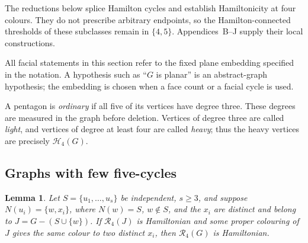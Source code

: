 \documentclass[11pt]{article}
\newtheorem{lemma}[theorem]{Lemma}
\theoremstyle{remark}
\newcommand{\R}{\mathcal R}
\numberwithin{equation}{section}
\numberwithin{table}{section}
\begin{document}
The reductions below splice Hamilton cycles and establish
Hamiltonicity at four colours. They do not prescribe arbitrary
endpoints, so the Hamilton-connected thresholds of these subclasses
remain in $\{4,5\}$. Appendices~B--J supply their local
constructions.

All facial statements in this section refer to the fixed plane embedding
specified in the notation.  A hypothesis such as ``$G$ is planar'' is an
abstract-graph hypothesis; the embedding is chosen when a face count or a
facial cycle is used.

A pentagon is \emph{ordinary} if all five of its vertices have degree three.
These degrees are measured in the graph before deletion. Vertices of degree
three are called \emph{light}, and vertices of degree at least four are
called \emph{heavy}; thus the heavy vertices are precisely
$\mathcal H_4(G)$.

\subsection{Graphs with few five-cycles}
\begin{lemma}
\label{lem:subdivided-star-four-subclass}
Let $S=\{u_1,\ldots,u_s\}$ be independent, $s\ge3$, and suppose
$N(u_i)=\{w,x_i\}$, where $N(w)=S$, $w\notin S$, and the $x_i$ are distinct and belong to
$J=G-(S\cup\{w\})$.  If $\R_4(J)$ is Hamiltonian and some proper colouring
of $J$ gives the same colour to two distinct $x_i$, then $\R_4(G)$ is
Hamiltonian.
\end{lemma}
\end{document}
